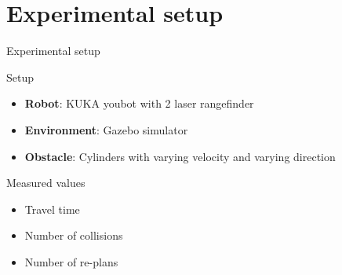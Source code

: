 \documentclass{beamer}
\begin{document}
\section{Experimental setup}
\begin{frame}[t]{\huge{Experimental setup}}
    \begin{block}{Setup}
        \begin{itemize}
            \item \textbf{Robot}: KUKA youbot with 2 laser rangefinder
            \item \textbf{Environment}: Gazebo simulator
            \item \textbf{Obstacle}: Cylinders with varying velocity and varying direction
        \end{itemize}    
    \end{block}
    \begin{block}{Measured values}
        \begin{itemize}
            \item Travel time
            \item Number of collisions
            \item Number of re-plans
        \end{itemize}
    \end{block}
\end{frame}
\end{document}

